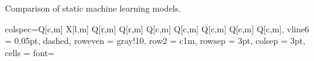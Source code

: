 \begin{table}[h!]
    \centering
    \caption{Comparison of static machine learning models.}

   \begin{tblr}[
    ]{
      colspec={Q[c,m]
               X[l,m]
               Q[r,m]
               Q[r,m]
               Q[c,m]
               Q[c,m]
               Q[c,m]
               Q[c,m]
               Q[c,m]},
      vline{6} = {0.05pt, dashed},
      row{even} = {gray!10},
      row{2} = {c1m},
      rowsep = 3pt,
      colsep = 3pt,
      cells = {font=\fontsize{7}{8}\linespread{1.00}\selectfont} %
    }
    

\end{tblr}
\end{table}
